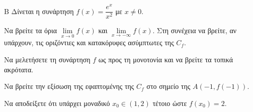 \begin{thema}{Β}
Δίνεται η συνάρτηση $f(x) = \dfrac{e^x}{x^2}$ με $x \ne 0$.
\begin{erwthma}
\item Να βρείτε τα όρια $\lim\limits_{x \to 0} f(x)$ και $\lim\limits_{x \to -\infty} f(x)$. Στη συνέχεια να βρείτε, αν υπάρχουν, τις οριζόντιες και κατακόρυφες ασύμπτωτες της $C_f$.
\item Να μελετήσετε τη συνάρτηση $f$ ως προς τη μονοτονία και να βρείτε τα τοπικά ακρότατα.
\item Να βρείτε την εξίσωση της εφαπτομένης της $C_f$ στο σημείο της $A(-1, f(-1))$.
\item Να αποδείξετε ότι υπάρχει μοναδικό $x_0 \in (1, 2)$ τέτοιο ώστε $f(x_0)=2$.
\end{erwthma}
\end{thema}

